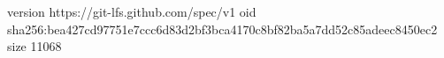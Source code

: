 version https://git-lfs.github.com/spec/v1
oid sha256:bea427cd97751e7ccc6d83d2bf3bca4170c8bf82ba5a7dd52c85adeec8450ec2
size 11068
